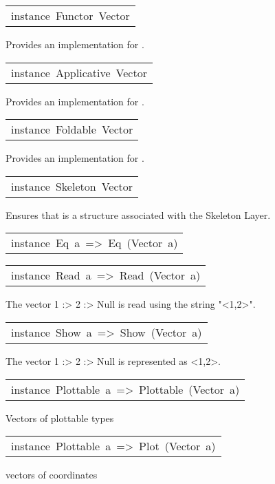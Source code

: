 \begin{haddockdesc}
\item[\begin{tabular}{@{}l}
instance\ Functor\ Vector
\end{tabular}]\haddockbegindoc
Provides an implementation for .\par


\item[\begin{tabular}{@{}l}
instance\ Applicative\ Vector
\end{tabular}]\haddockbegindoc
Provides an implementation for \haddockid{=*=}.\par


\item[\begin{tabular}{@{}l}
instance\ Foldable\ Vector
\end{tabular}]\haddockbegindoc
Provides an implementation for .\par


\item[\begin{tabular}{@{}l}
instance\ Skeleton\ Vector
\end{tabular}]\haddockbegindoc
Ensures that  is a structure associated with the Skeleton Layer.\par


\item[\begin{tabular}{@{}l}
instance\ Eq\ a\ =>\ Eq\ (Vector\ a)
\end{tabular}]

\item[\begin{tabular}{@{}l}
instance\ Read\ a\ =>\ Read\ (Vector\ a)
\end{tabular}]\haddockbegindoc
The vector 1 :> 2 :> Null is read using the string "<1,2>".\par


\item[\begin{tabular}{@{}l}
instance\ Show\ a\ =>\ Show\ (Vector\ a)
\end{tabular}]\haddockbegindoc
The vector 1 :> 2 :> Null is represented as <1,2>.\par


\item[\begin{tabular}{@{}l}
instance\ Plottable\ a\ =>\ Plottable\ (Vector\ a)
\end{tabular}]\haddockbegindoc
Vectors of plottable types\par


\item[\begin{tabular}{@{}l}
instance\ Plottable\ a\ =>\ Plot\ (Vector\ a)
\end{tabular}]\haddockbegindoc
vectors of coordinates\par

\end{haddockdesc}
